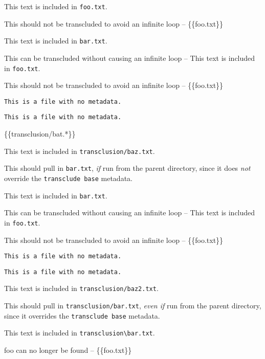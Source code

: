 
\def\mytitle{Transclusion}


This text is included in \texttt{foo.txt}.

This should not be transcluded to avoid an infinite loop -- \{\{foo.txt\}\}

This text is included in \texttt{bar.txt}.

This can be transcluded without causing an infinite loop --
This text is included in \texttt{foo.txt}.

This should not be transcluded to avoid an infinite loop -- \{\{foo.txt\}\}

\begin{verbatim}
This is a file with no metadata.
\end{verbatim}

\begin{verbatim}
This is a file with no metadata.
\end{verbatim}

\{\{transclusion\slash{}bat.*\}\}

This text is included in \texttt{transclusion\slash{}baz.txt}.

This should pull in \texttt{bar.txt}, \emph{if} run from the parent directory, since it
does \emph{not} override the \texttt{transclude base} metadata.

This text is included in \texttt{bar.txt}.

This can be transcluded without causing an infinite loop --
This text is included in \texttt{foo.txt}.

This should not be transcluded to avoid an infinite loop -- \{\{foo.txt\}\}

\begin{verbatim}
This is a file with no metadata.
\end{verbatim}

\begin{verbatim}
This is a file with no metadata.
\end{verbatim}

This text is included in \texttt{transclusion\slash{}baz2.txt}.

This should pull in \texttt{transclusion\slash{}bar.txt}, \emph{even if} run from the parent
directory, since it overrides the \texttt{transclude base} metadata.

This text is included in \texttt{transclusion\textbackslash{}bar.txt}.

foo can no longer be found -- \{\{foo.txt\}\}



